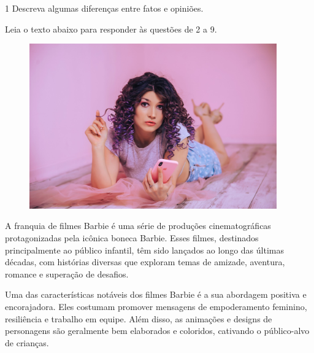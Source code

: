 
\num{1} Descreva algumas diferenças entre fatos e opiniões.


Leia o texto abaixo para responder às questões de 2 a 9.

\begin{myquote}

\begin{figure}[H]
\centering
\includegraphics[width=0.95\textwidth]{./imgSAEB_7_POR/media/image41.png}
\end{figure}

A franquia de filmes Barbie é uma série de produções cinematográficas
protagonizadas pela icônica boneca Barbie. Esses filmes, destinados
principalmente ao público infantil, têm sido lançados ao longo das últimas
décadas, com histórias diversas que exploram temas de amizade, aventura,
romance e superação de desafios.

Uma das características notáveis dos filmes Barbie é a sua abordagem
positiva e encorajadora. Eles costumam promover mensagens de empoderamento
feminino, resiliência e trabalho em equipe. Além disso, as animações e designs
de personagens são geralmente bem elaborados e coloridos, cativando o
público-alvo de crianças.


\end{myquote}
